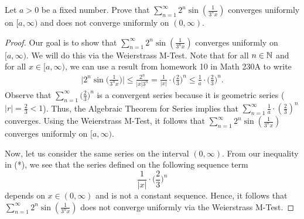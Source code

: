 \documentclass[a4paper]{article}
\begin{document}
\begin{problem}
    Let \( a > 0  \) be a fixed number. Prove that \( \sum_{ n=1  }^{ \infty  } 2^{n} \sin (\frac{ 1 }{ 3^{n}x  } ) \) converges uniformly on \( [a,\infty) \) and does not converge uniformly on \( (0,\infty ) \). 
\end{problem}
\begin{proof}
    Our goal is to show that \( \sum_{ n=1  }^{ \infty  } 2^{n} \sin (\frac{ 1 }{ 3^{n} x  } ) \) converges uniformly on \( [a,\infty) \). We will do this via the Weierstrass M-Test. Note that for all \( n \in \mathbb{N} \) and for all \( x \in [a,\infty) \), we can use a result from homework 10 in Math 230A to write   
    \begin{align*}
        \Big| 2^{n} \sin \Big(  \frac{ 1 }{ 3^{n} x  }  \Big) \Big| \leq  \frac{ 2^{n}  }{  | x  | 3^{n}     } = \frac{ 1 }{ | x  |  }  \cdot \Big(  \frac{ 2 }{ 3 }  \Big)^{n} \leq \frac{ 1 }{ a }  \cdot \Big(  \frac{ 2 }{ 3 }  \Big)^{n}. \tag{*}
    \end{align*}
    Observe that \( \sum_{ n=1  }^{ \infty  } \Big(  \frac{ 2 }{ 3 }  \Big)^{n} \) is a convergent series because it is geometric series (\( | r  |  = \frac{ 2 }{ 3 } < 1  \)). Thus, the Algebraic Theorem for Series implies that \( \sum_{ n=1  }^{ \infty  } \frac{ 1 }{ a }  \cdot (\frac{ 2 }{ 3 } )^{n} \) converges. Using the Weierstrass M-Test, it follows that \( \sum_{ n=1  }^{ \infty  } 2^{n} \sin (\frac{ 1 }{ 3^{n} x  } ) \) converges uniformly on \( [a,\infty) \).

    Now, let us consider the same series on the interval \( (0,\infty ) \). From our inequality in (*), we see that the series defined on the following sequence term
    \[ \frac{ 1 }{ | x  |  }  \cdot \Big(  \frac{ 2 }{ 3 }  \Big)^{n}   \]
    depends on \( x \in (0,\infty )  \) and is not a constant sequence. Hence, it follows that \( \sum_{ n=1  }^{ \infty  } 2^{n} \sin (\frac{ 1 }{ 3^{n}x  } ) \) does not converge uniformly via the Weierstrass M-Test.
\end{proof}
\end{document}
